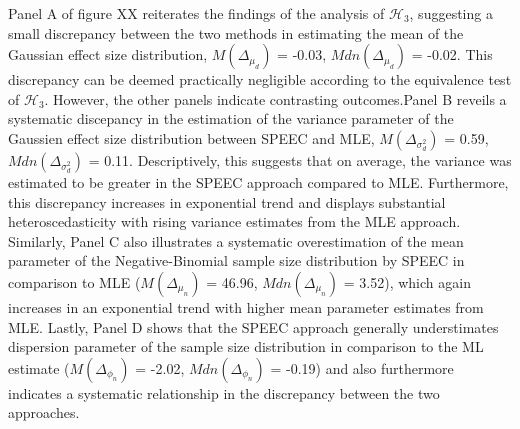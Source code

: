 \documentclass[
  12pt,
]{scrartcl}
\begin{document}
Panel A of figure XX reiterates the findings of the analysis of
\(\mathcal{H}_3\), suggesting a small discrepancy between the two
methods in estimating the mean of the Gaussian effect size distribution,
\(M({\Delta_{\mu_d}})\) = -0.03, \(Mdn({\Delta_{\mu_d}})\) = -0.02. This
discrepancy can be deemed practically negligible according to the
equivalence test of \(\mathcal{H}_3\). However, the other panels
indicate contrasting outcomes.Panel B reveils a systematic discepancy in
the estimation of the variance parameter of the Gaussien effect size
distribution between SPEEC and MLE, \(M({\Delta_{\sigma^2_d}})\) = 0.59,
\(Mdn({\Delta_{\sigma^2_d}})\) = 0.11. Descriptively, this suggests that
on average, the variance was estimated to be greater in the SPEEC
approach compared to MLE. Furthermore, this discrepancy increases in
exponential trend and displays substantial heteroscedasticity with
rising variance estimates from the MLE approach. Similarly, Panel C also
illustrates a systematic overestimation of the mean parameter of the
Negative-Binomial sample size distribution by SPEEC in comparison to MLE
(\(M({\Delta_{\mu_n}})\) = 46.96, \(Mdn({\Delta_{\mu_n}})\) = 3.52),
which again increases in an exponential trend with higher mean parameter
estimates from MLE. Lastly, Panel D shows that the SPEEC approach
generally understimates dispersion parameter of the sample size
distribution in comparison to the ML estimate (\(M({\Delta_{\phi_n}})\)
= -2.02, \(Mdn({\Delta_{\phi_n}})\) = -0.19) and also furthermore
indicates a systematic relationship in the discrepancy between the two
approaches.
\end{document}
